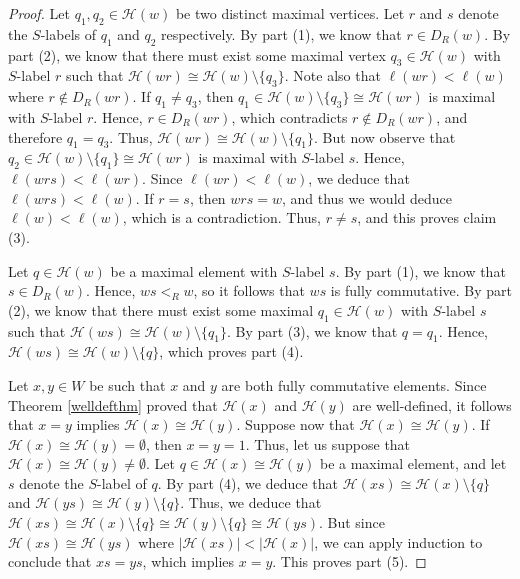\documentclass{amsart}
\theoremstyle{plain} %
\theoremstyle{definition}
\def\sweakr{<_{R}}
\def\H#1{\mathcal{H}(#1)}
\begin{document}
\begin{proof}
    Let $ q_{1}, q_{2} \in \H{w}$ be two distinct maximal vertices. Let $ r$ and $ s$ denote the $S$-labels of $ q_{1}$ and $ q_{2}$ respectively. By part (1), we know that $ r \in D_{R}(w)$. By part (2), we know that there must exist some maximal vertex $ q_{3} \in \H{w}$ with $ S$-label $r$ such that $ \H{wr} \cong \H{w} \setminus \{ q_{3} \}$. Note also that $ \ell(wr) < \ell(w)$ where $ r \notin D_{R}(wr)$. If $ q_{1} \neq q_{3}$, then $ q_{1} \in \H{w} \setminus \{ q_{3} \} \cong \H{wr}$ is maximal with $ S$-label $r$. Hence, $r \in D_{R}(wr)$, which contradicts $ r \notin D_{R}(wr) $, and therefore $ q_{1} = q_{3}$. Thus, $ \H{wr} \cong \H{w} \setminus \{ q_{1} \}$. But now observe that $ q_{2} \in \H{w} \setminus \{ q_{1} \} \cong \H{wr}$ is maximal with $ S$-label $s$. Hence, $ \ell(wrs) < \ell(wr)$. Since $ \ell(wr) < \ell(w)$, we deduce that $ \ell(wrs) < \ell(w)$. If $ r=s$, then $ wrs = w$, and thus we would deduce $ \ell(w) < \ell(w)$, which is a contradiction. Thus, $ r\neq s$, and this proves claim (3).

    Let $ q \in \H{w}$ be a maximal element with $S$-label $s$. By part (1), we know that $ s \in D_{R}(w)$. Hence, $ ws \sweakr w$, so it follows that $ ws$ is fully commutative. By part (2), we know that there must exist some maximal $ q_{1} \in \H{w}$ with $ S$-label $s$ such that $ \H{ws} \cong \H{w} \setminus \{ q_{1} \} $. By part (3), we know that $ q = q_{1}$. Hence, $ \H{ws} \cong \H{w} \setminus \{ q \}$, which proves part (4).

    Let $ x,y\in W$ be such that $ x$ and $ y $ are both fully commutative elements. Since Theorem \ref{welldefthm} proved that $ \H{x}$ and $ \H{y}$ are well-defined, it follows that $ x=y$ implies $ \H{x} \cong \H{y}$. Suppose now that $ \H{x} \cong \H{y}$. If $ \H{x} \cong \H{y} = \emptyset$, then $ x=y=1$. Thus, let us suppose that $ \H{x} \cong \H{y} \neq \emptyset$. Let $ q \in \H{x} \cong \H{y}$ be a maximal element, and let $ s$ denote the $S$-label of $ q$. By part (4), we deduce that $ \H{xs} \cong \H{x} \setminus \{  q \}$ and $ \H{ys} \cong \H{y} \setminus \{ q \}$. Thus, we deduce that $\H{xs} \cong \H{x} \setminus \{  q \} \cong \H{y} \setminus \{ q \} \cong \H{ys} $. But since $ \H{xs} \cong \H{ys}$ where $ |\H{xs}| < |\H{x}|$, we can apply induction to conclude that $ xs=ys$, which implies $ x=y$. This proves part (5).
\end{proof}
\end{document}
